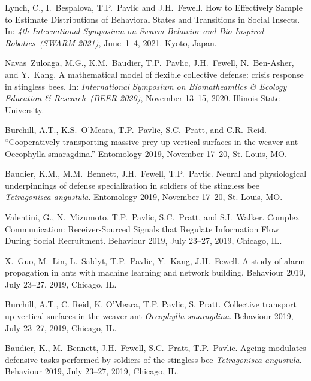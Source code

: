 \documentclass[10pt]{article}           %
\begin{document}
\begin{bibenum}
    \item Lynch, C., I.~Bespalova, T.P.~Pavlic and J.H.~Fewell.
        How to Effectively Sample to Estimate Distributions of
        Behavioral States and Transitions in Social Insects.
        In: \emph{4th International Symposium on
        Swarm Behavior and Bio-Inspired Robotics~(SWARM-2021)},
        June~1--4, 2021. Kyoto, Japan.

    \item Navas~Zuloaga, M.G., K.M.~Baudier, T.P.~Pavlic, J.H.~Fewell,
        N.~Ben-Asher, and Y.~Kang. A mathematical model of flexible
        collective defense: crisis response in stingless bees. In:
        \emph{International Symposium on Biomatheamtics \& Ecology
        Education \& Research~(BEER 2020)}, November 13--15, 2020.
        Illinois State University.

    \item Burchill, A.T., K.S.~O’Meara, T.P.~Pavlic, S.C.~Pratt,
        and C.R.~Reid. “Cooperatively transporting massive prey up
        vertical surfaces in the weaver ant Oecophylla smaragdina.”
        Entomology 2019, November 17--20, St. Louis, MO.

    \item Baudier, K.M., M.M.~Bennett, J.H.~Fewell, T.P.~Pavlic. Neural
        and physiological underpinnings of defense specialization in
        soldiers of the stingless bee \emph{Tetragonisca angustula}.
        Entomology 2019, November 17--20, St. Louis, MO.

    \item Valentini, G., N.~Mizumoto, T.P.~Pavlic, S.C.~Pratt, and
        S.I.~Walker. Complex Communication: Receiver-Sourced Signals
        that Regulate Information Flow During Social Recruitment.
        Behaviour 2019, July 23--27, 2019, Chicago, IL.

    \item X.~Guo, M.~Lin, L.~Saldyt, T.P.~Pavlic, Y.~Kang, J.H.~Fewell. A
        study of alarm propagation in ants with machine learning and
        network building. Behaviour 2019, July 23--27, 2019, Chicago,
        IL.

    \item Burchill, A.T., C. Reid, K. O’Meara, T.P. Pavlic, S. Pratt.
        Collective transport up vertical surfaces in the weaver ant
        \emph{Oecophylla smaragdina.} Behaviour 2019, July 23--27, 2019,
        Chicago, IL.

    \item Baudier, K., M.~Bennett, J.H.~Fewell, S.C.~Pratt, T.P.~Pavlic.
        Ageing modulates defensive tasks performed by soldiers of the
        stingless bee \emph{Tetragonisca angustula}. Behaviour 2019, July
        23--27, 2019, Chicago, IL.


\end{bibenum}
\end{document}
